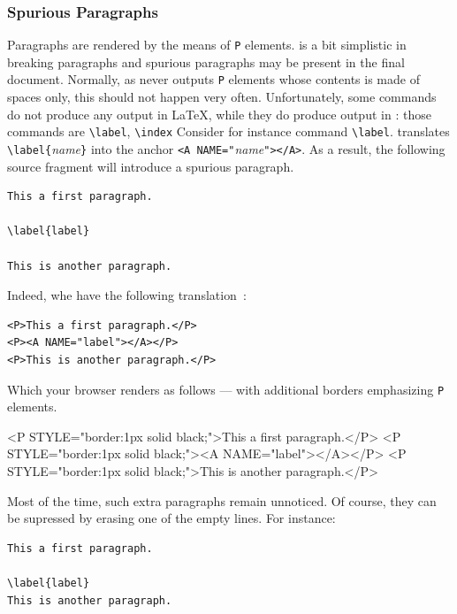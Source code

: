 \subsubsection{Spurious Paragraphs}
Paragraphs are rendered by the means of \verb+P+ elements.
\hevea{} is a bit simplistic in breaking paragraphs and spurious paragraphs
may be present in the final \html{} document.
Normally, as \hevea{} never outputs \verb+P+ elements whose contents is
made of spaces only, this should not happen very often.
Unfortunately, some commands do not produce any output in \LaTeX,
while they do produce output in \hevea: those commands
are \verb+\label+, \verb+\index+
Consider for instance command \verb+\label+. \hevea{} translates
\verb+\label{+\textit{name}\verb+}+ into the anchor
\verb+<A NAME="+\textit{name}\verb+"></A>+. As a result, the following
source fragment will introduce a spurious paragraph.
\begin{verbatim}
This a first paragraph.

\label{label}

This is another paragraph.
\end{verbatim}
Indeed, whe have the following translation~:
\begin{verbatim}
<P>This a first paragraph.</P>
<P><A NAME="label"></A></P>
<P>This is another paragraph.</P>
\end{verbatim}
\ifhevea Which your browser renders as follows --- with additional borders
emphasizing \verb+P+ elements.
\begin{htmlout}%
\begin{rawhtml}
<P STYLE="border:1px solid black;">This a first paragraph.</P>
<P STYLE="border:1px solid black;"><A NAME="label"></A></P>
<P STYLE="border:1px solid black;">This is another paragraph.</P>
\end{rawhtml}%
\end{htmlout}%
\fi

Most of the time, such extra paragraphs remain unnoticed.
Of course, they can be supressed by erasing one of the empty
lines. For instance:
\begin{verbatim}
This a first paragraph.

\label{label}
This is another paragraph.
\end{verbatim}

